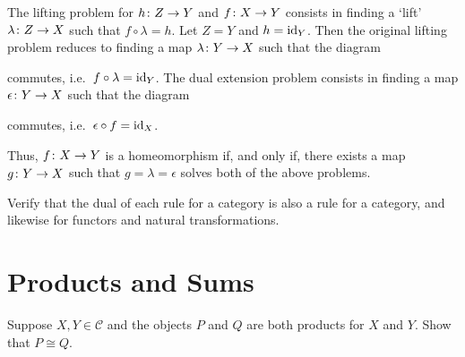 \bs
The lifting problem for $h\colon Z\to Y$ and $f\colon X\to Y$ consists in finding a `lift' $\lambda\colon Z\to X$ such that $f\circ \lambda=h$. Let $Z=Y$ and $h=\mathrm{id}_Y$. Then the original lifting problem reduces to finding a map $\lambda\colon Y\to X$ such that the diagram
\bse
{}
\ese
commutes, i.e.\ $f\circ \lambda=\mathrm{id}_Y$. The dual extension problem consists in finding a map $\epsilon\colon Y\to X$ such that the diagram
\bse
{}
\ese
commutes, i.e.\ $\epsilon\circ f=\mathrm{id}_X$.

Thus, $f\colon X\to Y$ is a homeomorphism if, and only if, there exists a map $g\colon Y\to X$ such that $g=\lambda=\epsilon$ solves both of the above problems.
\es

\bp
Verify that the dual of each rule for a category is also a rule for a category, and likewise for functors and natural transformations.
\ep

\bs
\es

\section{Products and Sums}

\bp
Suppose $X,Y\in \mathcal{C}$ and the objects $P$ and $Q$ are both products for $X$ and $Y$. Show that $P\cong Q$.
\ep

